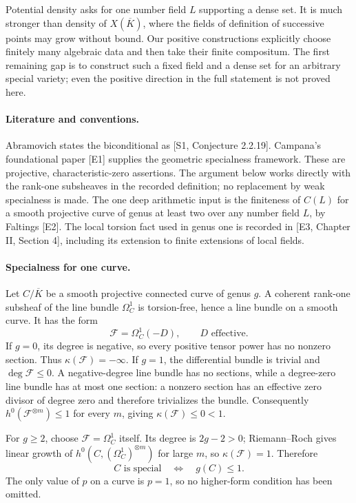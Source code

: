 \documentclass[11pt]{article}
\begin{document}
Potential density asks for one number field $L$ supporting a dense set. It is much stronger than density of $X(\overline K)$, where the fields of definition of successive points may grow without bound. Our positive constructions explicitly choose finitely many algebraic data and then take their finite compositum. The first remaining gap is to construct such a fixed field and a dense set for an arbitrary special variety; even the positive direction in the full statement is not proved here.

\paragraph{Literature and conventions.}
Abramovich states the biconditional as [S1, Conjecture 2.2.19]. Campana's foundational paper [E1] supplies the geometric specialness framework. These are projective, characteristic-zero assertions. The argument below works directly with the rank-one subsheaves in the recorded definition; no replacement by weak specialness is made. The one deep arithmetic input is the finiteness of $C(L)$ for a smooth projective curve of genus at least two over any number field $L$, by Faltings [E2]. The local torsion fact used in genus one is recorded in [E3, Chapter II, Section 4], including its extension to finite extensions of local fields.

\paragraph{Specialness for one curve.}
Let $C/\overline K$ be a smooth projective connected curve of genus $g$. A coherent rank-one subsheaf of the line bundle $\Omega_C^1$ is torsion-free, hence a line bundle on a smooth curve. It has the form
\[
 \mathcal F=\Omega_C^1(-D),\qquad D\text{ effective}.
 \tag{86.1}
\]
If $g=0$, its degree is negative, so every positive tensor power has no nonzero section. Thus $\kappa(\mathcal F)=-\infty$. If $g=1$, the differential bundle is trivial and $\deg\mathcal F\le0$. A negative-degree line bundle has no sections, while a degree-zero line bundle has at most one section: a nonzero section has an effective zero divisor of degree zero and therefore trivializes the bundle. Consequently $h^0(\mathcal F^{\otimes m})\le1$ for every $m$, giving $\kappa(\mathcal F)\le0<1$.

For $g\ge2$, choose $\mathcal F=\Omega_C^1$ itself. Its degree is $2g-2>0$; Riemann--Roch gives linear growth of $h^0(C,(\Omega_C^1)^{\otimes m})$ for large $m$, so $\kappa(\mathcal F)=1$. Therefore
\[
 C\text{ is special}\quad\Longleftrightarrow\quad g(C)\le1.
 \tag{86.2}
\]
The only value of $p$ on a curve is $p=1$, so no higher-form condition has been omitted.
\end{document}
